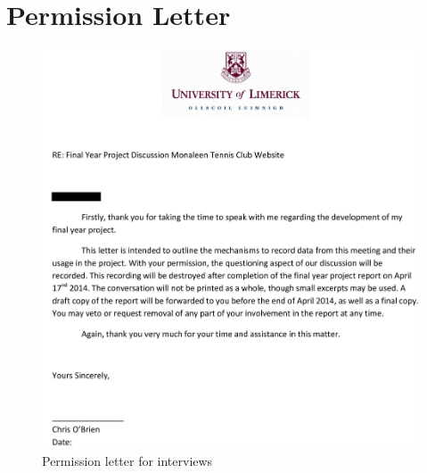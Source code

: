 \section{Permission Letter}

\begin{figure}[H]
\begin{center}
\includegraphics[width=14cm]{letter.jpg}
\end{center}
\caption{Permission letter for interviews}
\label{fig:letter}
\end{figure}
